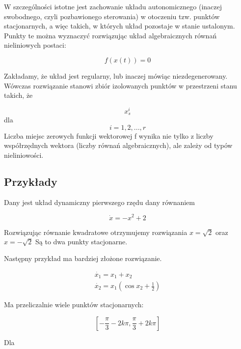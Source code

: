\documentclass{article}
\begin{document}
	W szczególności istotne jest zachowanie układu autonomicznego (inaczej swobodnego,
	czyli pozbawionego sterowania) w otoczeniu tzw. punktów stacjonarnych, a więc takich,
	w których układ pozostaje w stanie ustalonym. Punkty te można wyznaczyć rozwiązując
	układ algebraicznych równań nieliniowych postaci:
	
	\begin{equation}
		f(x(t)) = 0
	\end{equation}

	Zakładamy, że układ jest regularny, lub inaczej mówiąc niezdegenerowany. Wówczas rozwiązanie stanowi zbiór
	izolowanych punktów w przestrzeni stanu takich, że 

	\begin{equation}
		x_s^i 
	\end{equation}
	dla 
	\begin{equation}
 		i=1,2,..., r
	\end{equation}
	Liczba miejsc zerowych funkcji
	wektorowej f
	wynika nie tylko z liczby współrzędnych wektora (liczby równań
	algebraicznych), ale zależy od typów nieliniowości.
	\subsection{Przykłady}
		Dany jest układ dynamiczny pierwszego rzędu dany równaniem

		\begin{equation}
			\dot{x} = -x^2 + 2
		\end{equation}

		Rozwiązując równanie kwadratowe otrzymujemy rozwiązania
		$x = \sqrt{2}$ oraz $x = -\sqrt{2}$
		Są to dwa punkty stacjonarne.

		Następny przykład ma bardziej złożone rozwiązanie.

		\begin{equation}
			\begin{aligned}
				\dot{x_1} = x_1 + x_2 \\ 
				\dot{x_2} = x_1 \left( \cos{x_2} + \frac{1}{2} \right)
			\end{aligned}
		\end{equation}

		Ma przeliczalnie wiele punktów stacjonarnych:

		\begin{equation}
			\left[ -\frac{\pi}{3} - 2k\pi, \frac{\pi}{3} + 2k\pi \right]
		\end{equation}

		Dla
\end{document}
